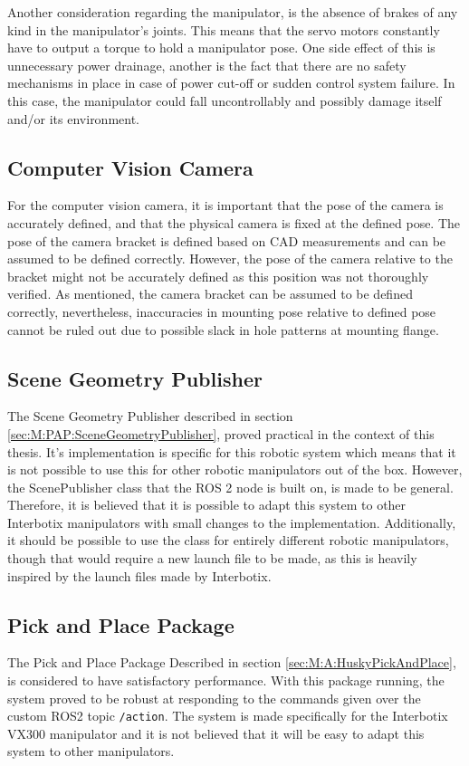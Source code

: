 Another consideration regarding the manipulator, is the absence of brakes of any kind in the manipulator's joints. This means that the servo motors constantly have to output a torque to hold a manipulator pose. One side effect of this is unnecessary power drainage, another is the fact that there are no safety mechanisms in place in case of power cut-off or sudden control system failure. In this case, the manipulator could fall uncontrollably and possibly damage itself and/or its environment.

\subsection{Computer Vision Camera}\label{sec:D:PAP:ManipulatorMountedCamera}
For the computer vision camera, it is important that the pose of the camera is accurately defined, and that the physical camera is fixed at the defined pose. The pose of the camera bracket is defined based on CAD measurements and can be assumed to be defined correctly. However, the pose of the camera relative to the bracket might not be accurately defined as this position was not thoroughly verified. As mentioned, the camera bracket can be assumed to be defined correctly, nevertheless, inaccuracies in mounting pose relative to defined pose cannot be ruled out due to possible slack in hole patterns at mounting flange.

\subsection{Scene Geometry Publisher}
The Scene Geometry Publisher described in section \ref{sec:M:PAP:SceneGeometryPublisher}, proved practical in the context of this thesis. It's implementation is specific for this robotic system which means that it is not possible to use this for other robotic manipulators out of the box. However, the ScenePublisher class that the ROS 2 node is built on, is made to be general. Therefore, it is believed that it is possible to adapt this system to other Interbotix manipulators with small changes to the implementation. Additionally, it should be possible to use the class for entirely different robotic manipulators, though that would require a new launch file to be made, as this is heavily inspired by the launch files made by Interbotix.

\subsection{Pick and Place Package}
The Pick and Place Package Described in section \ref{sec:M:A:HuskyPickAndPlace}, is considered to have satisfactory performance. With this package running, the system proved to be robust at responding to the commands given over the custom ROS2 topic \lstinline{/action}. The system is made specifically for the Interbotix VX300 manipulator and it is not believed that it will be easy to adapt this system to other manipulators. 

